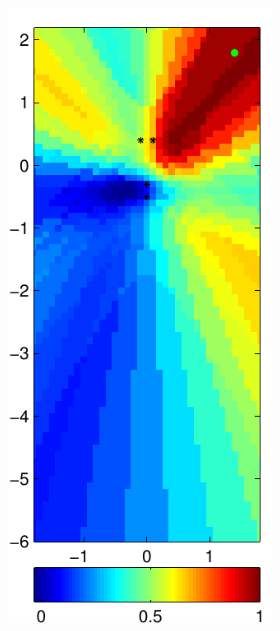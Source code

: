 \documentclass[spanish,openright]{book}
\begin{document}
\begin{figure}
\begin{subfigure}[t]{0.47\textwidth}
\begin{minipage}[t]{\textwidth}
\begin{subfigure}[t]{0.3\textwidth}
\label{fig:Pattern_Fo1500_pos06}
      \end{subfigure}
\begin{subfigure}[t]{0.3\textwidth}
        \includegraphics[width=\textwidth]{SRP_Fo1500_frame809_pos06}

\end{subfigure}
\end{minipage}
\end{subfigure}
\end{figure}
\end{document}
